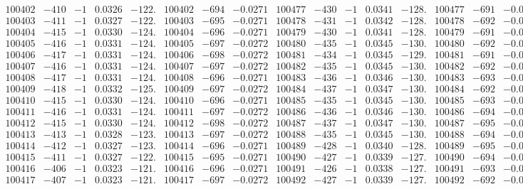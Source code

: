 \documentclass[11pt,reqno,a4letter]{article}
\numberwithin{figure}{section}
\numberwithin{table}{section}
\theoremstyle{plain}
\numberwithin{theorem}{section}
\theoremstyle{definition}
\begin{document}
\begin{table}[ht!]
\begin{equation*}
{\begin{array}{ccccc|ccc||ccccc|ccc}
100402 & -410 & -1 & 0.0326 & -122. & 100402 & -694 & -0.0271 & 100477 & -430 & -1 & 0.0341 & -128. & 100477 & -691 & -0.0270  \\
100403 & -411 & -1 & 0.0327 & -122. & 100403 & -695 & -0.0271 & 100478 & -431 & -1 & 0.0342 & -128. & 100478 & -692 & -0.0270  \\
100404 & -415 & -1 & 0.0330 & -124. & 100404 & -696 & -0.0271 & 100479 & -430 & -1 & 0.0341 & -128. & 100479 & -691 & -0.0270  \\
100405 & -416 & -1 & 0.0331 & -124. & 100405 & -697 & -0.0272 & 100480 & -435 & -1 & 0.0345 & -130. & 100480 & -692 & -0.0270  \\
100406 & -417 & -1 & 0.0331 & -124. & 100406 & -698 & -0.0272 & 100481 & -434 & -1 & 0.0345 & -129. & 100481 & -691 & -0.0269  \\
100407 & -416 & -1 & 0.0331 & -124. & 100407 & -697 & -0.0272 & 100482 & -435 & -1 & 0.0345 & -130. & 100482 & -692 & -0.0270  \\
100408 & -417 & -1 & 0.0331 & -124. & 100408 & -696 & -0.0271 & 100483 & -436 & -1 & 0.0346 & -130. & 100483 & -693 & -0.0270  \\
100409 & -418 & -1 & 0.0332 & -125. & 100409 & -697 & -0.0272 & 100484 & -437 & -1 & 0.0347 & -130. & 100484 & -692 & -0.0270  \\
100410 & -415 & -1 & 0.0330 & -124. & 100410 & -696 & -0.0271 & 100485 & -435 & -1 & 0.0345 & -130. & 100485 & -693 & -0.0270  \\
100411 & -416 & -1 & 0.0331 & -124. & 100411 & -697 & -0.0272 & 100486 & -436 & -1 & 0.0346 & -130. & 100486 & -694 & -0.0271  \\
100412 & -415 & -1 & 0.0330 & -124. & 100412 & -698 & -0.0272 & 100487 & -437 & -1 & 0.0347 & -130. & 100487 & -695 & -0.0271  \\
100413 & -413 & -1 & 0.0328 & -123. & 100413 & -697 & -0.0272 & 100488 & -435 & -1 & 0.0345 & -130. & 100488 & -694 & -0.0271  \\
100414 & -412 & -1 & 0.0327 & -123. & 100414 & -696 & -0.0271 & 100489 & -428 & -1 & 0.0340 & -128. & 100489 & -695 & -0.0271  \\
100415 & -411 & -1 & 0.0327 & -122. & 100415 & -695 & -0.0271 & 100490 & -427 & -1 & 0.0339 & -127. & 100490 & -694 & -0.0271  \\
100416 & -406 & -1 & 0.0323 & -121. & 100416 & -696 & -0.0271 & 100491 & -426 & -1 & 0.0338 & -127. & 100491 & -693 & -0.0270  \\
100417 & -407 & -1 & 0.0323 & -121. & 100417 & -697 & -0.0272 & 100492 & -427 & -1 & 0.0339 & -127. & 100492 & -692 & -0.0270  \\

\end{array}}
\end{equation*}
\end{table}
\end{document}
